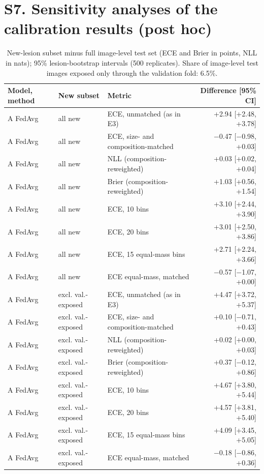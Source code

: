 \documentclass[10pt]{article}
\begin{document}
\section*{S7. Sensitivity analyses of the calibration results (post hoc)}
\begin{table}[!htbp]
\centering
\scriptsize
\caption{New-lesion subset minus full image-level test set (ECE and Brier in points, NLL in nats); 95\% lesion-bootstrap intervals (500 replicates). Share of image-level test images exposed only through the validation fold: 6.5\%.}
\label{tab:s8}
\begin{tabular}{@{}lllr@{}}
\toprule
Model, method & New subset & Metric & Difference [95\% CI] \\
\midrule
A FedAvg & all new & ECE, unmatched (as in E3) & +2.94 [+2.48, +3.78] \\
A FedAvg & all new & ECE, size- and composition-matched & $-$0.47 [$-$0.98, +0.03] \\
A FedAvg & all new & NLL (composition-reweighted) & +0.03 [+0.02, +0.04] \\
A FedAvg & all new & Brier (composition-reweighted) & +1.03 [+0.56, +1.54] \\
A FedAvg & all new & ECE, 10 bins & +3.10 [+2.44, +3.90] \\
A FedAvg & all new & ECE, 20 bins & +3.01 [+2.50, +3.86] \\
A FedAvg & all new & ECE, 15 equal-mass bins & +2.71 [+2.24, +3.66] \\
A FedAvg & all new & ECE equal-mass, matched & $-$0.57 [$-$1.07, +0.00] \\
A FedAvg & excl. val.-exposed & ECE, unmatched (as in E3) & +4.47 [+3.72, +5.37] \\
A FedAvg & excl. val.-exposed & ECE, size- and composition-matched & +0.10 [$-$0.71, +0.43] \\
A FedAvg & excl. val.-exposed & NLL (composition-reweighted) & +0.02 [+0.00, +0.03] \\
A FedAvg & excl. val.-exposed & Brier (composition-reweighted) & +0.37 [$-$0.12, +0.86] \\
A FedAvg & excl. val.-exposed & ECE, 10 bins & +4.67 [+3.80, +5.44] \\
A FedAvg & excl. val.-exposed & ECE, 20 bins & +4.57 [+3.81, +5.40] \\
A FedAvg & excl. val.-exposed & ECE, 15 equal-mass bins & +4.09 [+3.45, +5.05] \\
A FedAvg & excl. val.-exposed & ECE equal-mass, matched & $-$0.18 [$-$0.86, +0.36] \\

\end{tabular}
\end{table}
\end{document}

